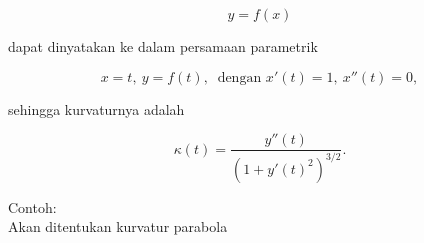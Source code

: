 \documentclass[a4paper,10pt]{article}
\begin{document}
\begin{eulernotebook}
\begin{eulercomment}
\begin{eulercomment}
\begin{eulercomment}
\begin{eulercomment}
\begin{eulercomment}
\begin{eulercomment}
\begin{eulercomment}
\begin{eulercomment}
\begin{eulercomment}
\begin{eulercomment}
\begin{eulercomment}
\begin{eulercomment}
\begin{eulercomment}
\begin{eulercomment}
\begin{eulercomment}
\begin{eulercomment}
\begin{eulercomment}
\begin{eulercomment}
\begin{eulercomment}
\begin{eulercomment}
\begin{eulercomment}
\end{eulercomment}
\begin{eulerformula}
\[
y=f(x)
\]
\end{eulerformula}
\begin{eulercomment}
dapat dinyatakan ke dalam persamaan parametrik

\end{eulercomment}
\begin{eulerformula}
\[
x=t,\ y=f(t),\ \text{ dengan } x'(t)=1,\ x''(t)=0,
\]
\end{eulerformula}
\begin{eulercomment}
sehingga kurvaturnya adalah

\end{eulercomment}
\begin{eulerformula}
\[
\kappa(t) = \frac{y''(t)}{\left(1+y'(t)^2\right)^{3/2}}.
\]
\end{eulerformula}
\begin{eulercomment}
Contoh:\\
Akan ditentukan kurvatur parabola


\end{eulercomment}
\end{eulercomment}
\end{eulercomment}
\end{eulercomment}
\end{eulercomment}
\end{eulercomment}
\end{eulercomment}
\end{eulercomment}
\end{eulercomment}
\end{eulercomment}
\end{eulercomment}
\end{eulercomment}
\end{eulercomment}
\end{eulercomment}
\end{eulercomment}
\end{eulercomment}
\end{eulercomment}
\end{eulercomment}
\end{eulercomment}
\end{eulercomment}
\end{eulercomment}
\end{eulernotebook}
\end{document}
